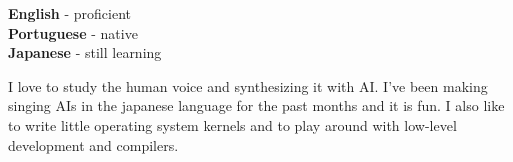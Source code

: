 \documentclass[9pt]{developercv} %
\begin{document}
\begin{minipage}[t]{0.3\textwidth}
	\vspace{-\baselineskip} %

	
	\textbf{English} - proficient\\
	\textbf{Portuguese} - native\\
	\textbf{Japanese} - still learning\\
\end{minipage}
\hfill
\begin{minipage}[t]{0.6\textwidth}
	\vspace{-\baselineskip} %
	
	
	I love to study the human voice and synthesizing it with AI. I've been making singing AIs in the japanese language for the past months and it is fun. I also like to write little operating system kernels and to play around with low-level development and compilers.
\end{minipage}
%	
%	

\end{document}
